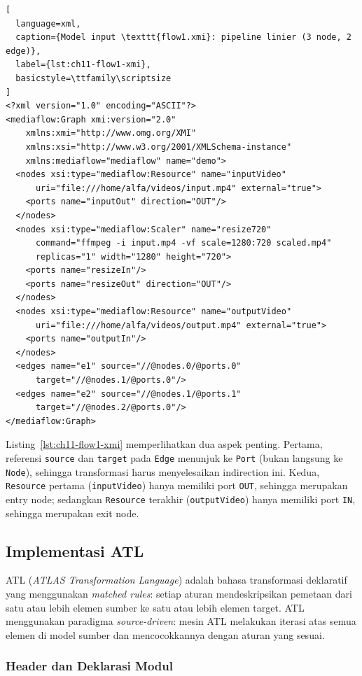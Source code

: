 \begin{lstlisting}[
  language=xml,
  caption={Model input \texttt{flow1.xmi}: pipeline linier (3 node, 2 edge)},
  label={lst:ch11-flow1-xmi},
  basicstyle=\ttfamily\scriptsize
]
<?xml version="1.0" encoding="ASCII"?>
<mediaflow:Graph xmi:version="2.0"
    xmlns:xmi="http://www.omg.org/XMI"
    xmlns:xsi="http://www.w3.org/2001/XMLSchema-instance"
    xmlns:mediaflow="mediaflow" name="demo">
  <nodes xsi:type="mediaflow:Resource" name="inputVideo"
      uri="file:///home/alfa/videos/input.mp4" external="true">
    <ports name="inputOut" direction="OUT"/>
  </nodes>
  <nodes xsi:type="mediaflow:Scaler" name="resize720"
      command="ffmpeg -i input.mp4 -vf scale=1280:720 scaled.mp4"
      replicas="1" width="1280" height="720">
    <ports name="resizeIn"/>
    <ports name="resizeOut" direction="OUT"/>
  </nodes>
  <nodes xsi:type="mediaflow:Resource" name="outputVideo"
      uri="file:///home/alfa/videos/output.mp4" external="true">
    <ports name="outputIn"/>
  </nodes>
  <edges name="e1" source="//@nodes.0/@ports.0"
      target="//@nodes.1/@ports.0"/>
  <edges name="e2" source="//@nodes.1/@ports.1"
      target="//@nodes.2/@ports.0"/>
</mediaflow:Graph>
\end{lstlisting}

\noindent Listing~\ref{lst:ch11-flow1-xmi} memperlihatkan dua aspek penting. Pertama, referensi \texttt{source} dan \texttt{target} pada \texttt{Edge} menunjuk ke \texttt{Port} (bukan langsung ke \texttt{Node}), sehingga transformasi harus menyelesaikan indirection ini. Kedua, \texttt{Resource} pertama (\texttt{inputVideo}) hanya memiliki port \texttt{OUT}, sehingga merupakan entry node; sedangkan \texttt{Resource} terakhir (\texttt{outputVideo}) hanya memiliki port \texttt{IN}, sehingga merupakan exit node.

\subsection{Implementasi ATL}

ATL (\textit{ATLAS Transformation Language}) adalah bahasa transformasi deklaratif yang menggunakan \textit{matched rules}: setiap aturan mendeskripsikan pemetaan dari satu atau lebih elemen sumber ke satu atau lebih elemen target. ATL menggunakan paradigma \textit{source-driven}: mesin ATL melakukan iterasi atas semua elemen di model sumber dan mencocokkannya dengan aturan yang sesuai.

\subsubsection{Header dan Deklarasi Modul}

